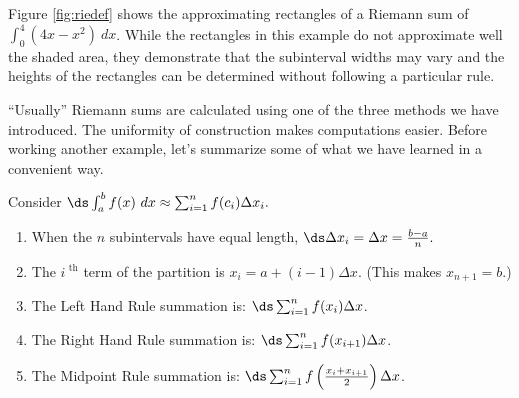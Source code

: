 Figure \ref{fig:riedef} shows the approximating rectangles of a Riemann sum of $\int_0^4(4x-x^2)\ dx$. While the rectangles in this example do not approximate well the shaded area, they demonstrate that the subinterval widths may vary and the heights of the rectangles can be determined without following a particular rule.

``Usually'' Riemann sums are calculated using one of the three methods we have introduced. The uniformity of construction  makes computations easier. Before working another example, let's summarize some of what we have learned in a convenient way.

{Consider $\ds \int_a^b f(x) \ dx \approx \sum_{i=1}^n f(c_i)\Delta x_i.$ 

\begin{enumerate}
\item	When the $n$ subintervals have equal length, $\ds \Delta x_i = \Delta x = \frac{b-a}n.$
\item		The $i^\text{ th}$ term of the partition is $x_i = a + (i-1)\Delta x$. (This makes $x_{n+1} = b$.)
\item		The Left Hand Rule summation is: $\ds \sum_{i=1}^n f(x_i)\Delta x$.
\item		The Right Hand Rule summation is: $\ds \sum_{i=1}^n f(x_{i+1})\Delta x$.
\item		The Midpoint Rule summation is: $\ds \sum_{i=1}^n f\left(\frac{x_i+x_{i+1}}{2}\right)\Delta x$.
\end{enumerate}
}
\restoreboxwidth
%
%
%


